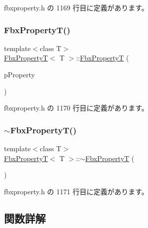  fbxproperty.\+h の 1169 行目に定義があります。

\mbox{\label{class_fbx_property_t_afa5d35b87d71aa68d84f12fb39de89e4}} 
\subsubsection{\texorpdfstring{Fbx\+Property\+T()}{FbxPropertyT()}\hspace{0.1cm}{\footnotesize\ttfamily [2/2]}}
{\footnotesize\ttfamily template$<$class T$>$ \\
\hyperlink{class_fbx_property_t}{Fbx\+PropertyT}$<$ T $>$\+::\hyperlink{class_fbx_property_t}{Fbx\+PropertyT} (\begin{DoxyParamCaption}\item[{const \hyperlink{class_fbx_property}{Fbx\+Property} \&}]{p\+Property }\end{DoxyParamCaption})\hspace{0.3cm}{\ttfamily [inline]}}



 fbxproperty.\+h の 1170 行目に定義があります。

\mbox{\label{class_fbx_property_t_a26fa61ca6f7ef315a7121d0190080622}} 
\subsubsection{\texorpdfstring{$\sim$\+Fbx\+Property\+T()}{~FbxPropertyT()}}
{\footnotesize\ttfamily template$<$class T$>$ \\
\hyperlink{class_fbx_property_t}{Fbx\+PropertyT}$<$ T $>$\+::$\sim$\hyperlink{class_fbx_property_t}{Fbx\+PropertyT} (\begin{DoxyParamCaption}{ }\end{DoxyParamCaption})\hspace{0.3cm}{\ttfamily [inline]}}



 fbxproperty.\+h の 1171 行目に定義があります。



\subsection{関数詳解}
\mbox{\label{class_fbx_property_t_a07f3d2e638b5f65838338eb03296c3f9}} 
